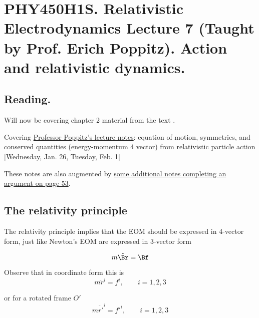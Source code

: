 
%

\chapter{PHY450H1S.  Relativistic Electrodynamics Lecture 7 (Taught by Prof. Erich Poppitz).  Action and relativistic dynamics.}
\label{chap:relativisticElectrodynamicsL7}
{}
\date{Jan 26, 2011}

\beginArtNoToc

\section{Reading.}

Will now be covering chapter 2 material from the text \cite{landau1980classical}.

Covering \href{http://www.physics.utoronto.ca/~poppitz/e-poppitz/PHY450_files/RelEMpp52-56.pdf}{Professor Poppitz's lecture notes}: equation of motion, symmetries, and conserved quantities (energy-momentum 4 vector) from relativistic particle action [Wednesday, Jan. 26, Tuesday, Feb. 1]

These notes are also augmented by \href{http://www.physics.utoronto.ca/~poppitz/e-poppitz/PHY450_files/RelEMp53.1.pdf}{some additional notes completing an argument on page 53}.

\section{The relativity principle}

The relativity principle implies that the EOM should be expressed in 4-vector form, just like Newton's EOM are expressed in 3-vector form

\begin{equation}\label{eqn:relativisticElectrodynamicsL7:10}
m \ddot{\Br} = \Bf
\end{equation}

Observe that in coordinate form this is
\begin{equation}\label{eqn:relativisticElectrodynamicsL7:20}
m \ddot{r}^i = f^i, \qquad i = 1,2,3
\end{equation}

or for a rotated frame $O'$
\begin{equation}\label{eqn:relativisticElectrodynamicsL7:30}
m \ddot{r'}^i = {f'}^i, \qquad i = 1,2,3
\end{equation}

